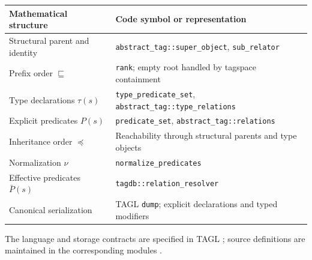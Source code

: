 \documentclass{article}
\begin{document}
\begin{center}
\begin{tabularx}{\textwidth}{@{}YY@{}}
\toprule
\textbf{Mathematical structure} & \textbf{Code symbol or representation} \\
\midrule
Structural parent and identity & \texttt{abstract\_tag::super\_object}, \texttt{sub\_relator} \\
Prefix order $\sqsubseteq$ & \texttt{rank}; empty root handled by tagspace containment \\
Type declarations $\tau(s)$ & \texttt{type\_predicate\_set}, \texttt{abstract\_tag::type\_relations} \\
Explicit predicates $P(s)$ & \texttt{predicate\_set}, \texttt{abstract\_tag::relations} \\
Inheritance order $\preceq$ & Reachability through structural parents and type objects \\
Normalization $\nu$ & \texttt{normalize\_predicates} \\
Effective predicates $\bar P(s)$ & \texttt{tagdb::relation\_resolver} \\
Canonical serialization & TAGL \texttt{dump}; explicit declarations and typed modifiers \\
\bottomrule
\end{tabularx}
\end{center}
The language and storage contracts are specified in TAGL \cite{spec};
source definitions are maintained in the corresponding modules
\cite{hardtags,rankh,tagdh,tagdcc,sqlite}.
\end{document}
